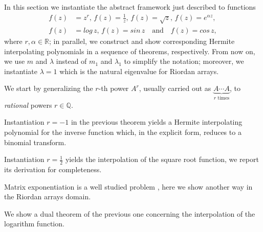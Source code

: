 In this section we instantiate the abstract framework just described to functions
\begin{displaymath}
\begin{split}
f(z)&=z^{r},\,{f(z)=\frac{1}{z}},\,{f(z)=\sqrt{z}},\,{f(z)=e^{\alpha z}},\\
f(z)&=log\,{z},\,f(z)=sin\,{z}\quad\text{and}\quad f(z)=cos\,{z},
\end{split}
\end{displaymath}
where $r,\alpha\in\mathbb{R}$; in parallel, we construct and show corresponding
Hermite interpolating polynomials in a sequence of theorems, respectively.
From now on, we use $m$ and $\lambda$ instead of $m_{1}$ and $\lambda_{1}$ to
simplify the notation; moreover, we instantiate $\lambda=1$ which is the
natural eigenvalue for Riordan arrays.

We start by generalizing the $r$-th power $A^{r}$, usually carried out
as $\underbrace{A\cdots A}_{r\text{ times}}$, to \textit{rational} powers
$r\in\mathbb{Q}$.



Instantiation $r=-1$ in the previous theorem yields a Hermite interpolating
polynomial for the inverse function which, in the explicit form, reduces to
a binomial transform.



\vfill

Instantiation $r=\frac{1}{2}$ yields the interpolation of the square root function,
we report its derivation for completeness.



Matrix exponentiation is a well studied problem \citep{MOLERLOAN2003}, here
we show another way in the Riordan arrays domain.



We show a dual theorem of the previous one concerning the interpolation of the
logarithm function.

\vfill




